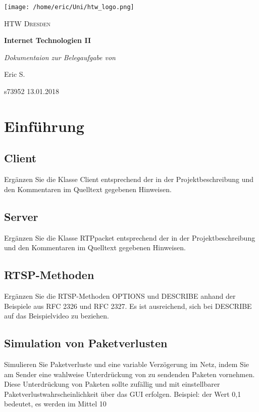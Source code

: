 



	\begin{titlepage}
		\centering
		\texttt{[image: /home/eric/Uni/htw\_logo.png]}\par\vspace{1cm}
		{\scshape\LARGE HTW Dresden \par}
		\vspace{2cm}
		{\huge\bfseries Internet Technologien II \par}
		\vspace{2cm}
		{\Large\itshape Dokumentaion zur Belegaufgabe von\par Eric \textsc{S.} \par}
		\vfill
		s73952 \ret
		\vfill
		{13.01.2018}
	\end{titlepage}
\newpage \tableofcontents \newpage


\section{Einführung}
\subsection{Client}
Ergänzen Sie die Klasse Client entsprechend der in der Projektbeschreibung und den Kommentaren im Quelltext gegebenen Hinweisen.
\subsection{Server}
Ergänzen Sie die Klasse RTPpacket entsprechend der in der Projektbeschreibung und den Kommentaren im Quelltext gegebenen Hinweisen.
\subsection{RTSP-Methoden}
Ergänzen Sie die RTSP-Methoden OPTIONS und DESCRIBE anhand der Beispiele aus RFC 2326 und RFC 2327. Es ist ausreichend, sich bei DESCRIBE auf das Beispielvideo zu beziehen.
\subsection{Simulation von Paketverlusten}
Simulieren Sie Paketverluste und eine variable Verzögerung im Netz, indem Sie am Sender eine wahlweise Unterdrückung von zu sendenden Paketen vornehmen. Diese Unterdrückung von Paketen sollte zufällig und mit einstellbarer Paketverlustwahrscheinlichkeit über das GUI erfolgen. Beispiel: der Wert 0,1 bedeutet, es werden im Mittel 10%
